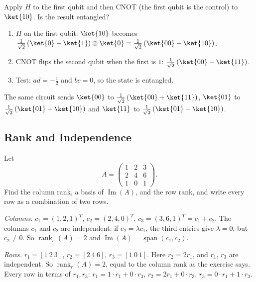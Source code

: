 \begin{exercisebox}
\begin{pproblem}\label{pp:circuit}
    Apply $H$ to the first qubit and then CNOT (the first qubit is the control) to $\ket{10}$. Is
    the result entangled?
\end{pproblem}
\tcblower
\begin{wsolution}
    \leavevmode
    \begin{enumerate}
        \item $H$ on the first qubit: $\ket{10}$ becomes
              $\frac{1}{\sqrt{2}}\left(\ket{0} - \ket{1}\right) \otimes \ket{0}
                  = \frac{1}{\sqrt{2}}\left(\ket{00} - \ket{10}\right)$.
        \item CNOT flips the second qubit when the first is $1$:
              $\frac{1}{\sqrt{2}}\left(\ket{00} - \ket{11}\right)$.
        \item Test: $ad = -\frac{1}{2}$ and $bc = 0$, so the state is entangled.
    \end{enumerate}
    The same circuit sends $\ket{00}$ to $\frac{1}{\sqrt{2}}\left(\ket{00} + \ket{11}\right)$,
    $\ket{01}$ to $\frac{1}{\sqrt{2}}\left(\ket{01} + \ket{10}\right)$ and $\ket{11}$ to
    $\frac{1}{\sqrt{2}}\left(\ket{01} - \ket{10}\right)$.
\end{wsolution}
\end{exercisebox}


\subsection{Rank and Independence}

\begin{exercisebox}
\begin{pproblem}\label{wp:rank}
    Let
    \[A = \begin{pmatrix} 1 & 2 & 3 \\ 2 & 4 & 6 \\ 1 & 0 & 1 \end{pmatrix}.\]
    Find the column rank, a basis of $\operatorname{Im}(A)$, and the row rank, and write every row
    as a combination of two rows.
\end{pproblem}
\tcblower
\begin{wsolution}
    \emph{Columns.} $c_1 = (1, 2, 1)^T$, $c_2 = (2, 4, 0)^T$, $c_3 = (3, 6, 1)^T = c_1 + c_2$. The
    columns $c_1$ and $c_2$ are independent: if $c_2 = \lambda c_1$, the third entries give
    $\lambda = 0$, but $c_2 \neq 0$. So $\operatorname{rank}_c(A) = 2$ and $\operatorname{Im}(A)
    = \operatorname{span}(c_1, c_2)$.

    \emph{Rows.} $r_1 = [1\ 2\ 3]$, $r_2 = [2\ 4\ 6]$, $r_3 = [1\ 0\ 1]$. Here $r_2 = 2r_1$, and
    $r_1$, $r_3$ are independent. So $\operatorname{rank}_r(A) = 2$, equal to the column rank as the
    exercise says. Every row in terms of $r_1, r_3$: $r_1 = 1 \cdot r_1 + 0 \cdot r_3$,
    $r_2 = 2 r_1 + 0 \cdot r_3$, $r_3 = 0 \cdot r_1 + 1 \cdot r_3$.
\end{wsolution}
\end{exercisebox}

